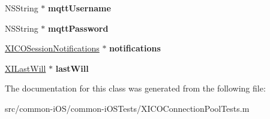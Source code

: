\begin{DoxyCompactItemize}
N\+S\+String $\ast$ {\bfseries mqtt\+Username}
\item 
\hypertarget{interface_x_i_c_o_connection_pool_tests_ad376fd7c1c7ad0be4f0e5ba936852e32}{}\label{interface_x_i_c_o_connection_pool_tests_ad376fd7c1c7ad0be4f0e5ba936852e32} 
N\+S\+String $\ast$ {\bfseries mqtt\+Password}
\item 
\hypertarget{interface_x_i_c_o_connection_pool_tests_a3278df70924fb1021256b8fe2402735b}{}\label{interface_x_i_c_o_connection_pool_tests_a3278df70924fb1021256b8fe2402735b} 
\hyperlink{interface_x_i_c_o_session_notifications}{X\+I\+C\+O\+Session\+Notifications} $\ast$ {\bfseries notifications}
\item 
\hypertarget{interface_x_i_c_o_connection_pool_tests_aa20beae072bb0d2f8a6f9853df957f4d}{}\label{interface_x_i_c_o_connection_pool_tests_aa20beae072bb0d2f8a6f9853df957f4d} 
\hyperlink{class_x_i_last_will}{X\+I\+Last\+Will} $\ast$ {\bfseries last\+Will}
\end{DoxyCompactItemize}


The documentation for this class was generated from the following file\+:\begin{DoxyCompactItemize}
\item 
src/common-\/i\+O\+S/common-\/i\+O\+S\+Tests/X\+I\+C\+O\+Connection\+Pool\+Tests.\+m\end{DoxyCompactItemize}
